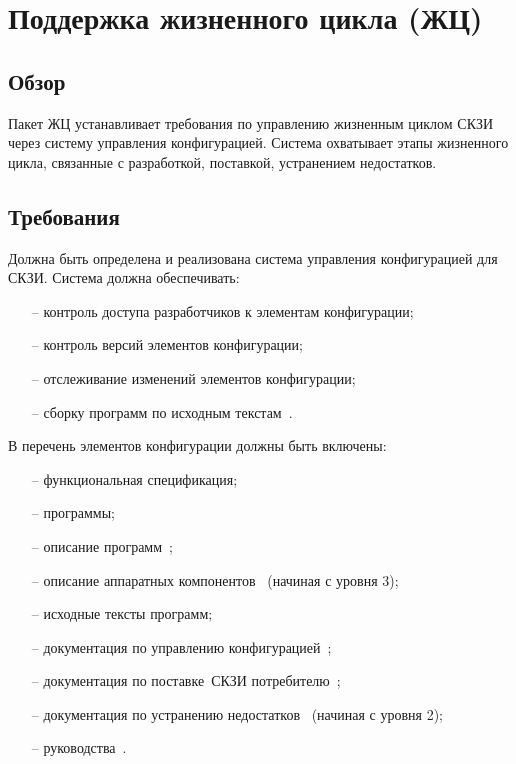 \section{Поддержка жизненного цикла (ЖЦ)}\label{LC}

\subsection{Обзор}\label{LC.Intro}

Пакет ЖЦ устанавливает требования по управлению жизненным циклом СКЗИ
через систему управления конфигурацией. Система охватывает этапы жизненного 
цикла, связанные с разработкой, поставкой, устранением недостатков.

\subsection{Требования}\label{LC.Reqs}

\label{R.LC.CMSystem}
Должна быть определена и реализована система управления конфигурацией для СКЗИ.
Система должна обеспечивать:
\begin{itemize}
\item[--]
контроль доступа разработчиков к элементам конфигурации;
\item[--]
контроль версий элементов конфигурации;
\item[--]
отслеживание изменений элементов конфигурации;
\item[--]
сборку программ по исходным текстам~.
\end{itemize}

\label{R.LC.CMList}
В перечень элементов конфигурации должны быть включены:
\begin{itemize}
\item[--]
функциональная спецификация;
\item[--]
программы;
\item[--]
описание программ~;
\item[--]
описание аппаратных компонентов~
(начиная с уровня 3);
\item[--]
исходные тексты программ;
\item[--]
документация по управлению конфигурацией~;
\item[--]
документация по поставке~СКЗИ потребителю~;
\item[--]
документация по устранению недостатков~
(начиная с уровня 2);
\item[--]
руководства~.
\end{itemize}

